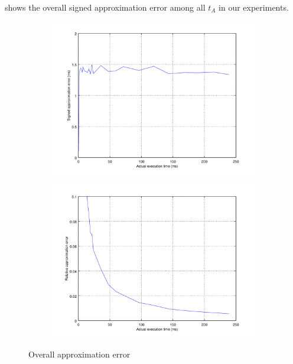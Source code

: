  shows the overall signed approximation error among all $t_A$ in our experiments.

\begin{figure}[ht!]
	\center
	\begin{subfigure}{0.45\linewidth}
		\center
		\includegraphics[width=1\linewidth]{fig/esterr.png}
	\end{subfigure}
	\begin{subfigure}{0.45\linewidth}
		\center
		\includegraphics[width=\linewidth]{fig/rtvesterr.png}
	\end{subfigure}
	\caption{Overall approximation error}
	\label{Fig: Overall estimation error}
\end{figure}

